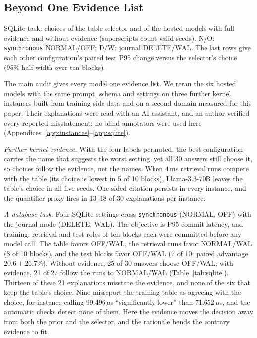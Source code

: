 \subsection{Beyond One Evidence List}
\label{subsec:generality}
\begin{table}[t]
\centering\footnotesize\setlength{\tabcolsep}{3pt}
\caption{SQLite task: choices of the table selector and of the hosted models with full evidence and without evidence (superscripts count valid seeds). N/O: \texttt{synchronous} NORMAL/OFF; D/W: journal DELETE/WAL. The last rows give each other configuration's paired test P95 change versus the selector's choice (95\% half-width over ten blocks).}
\label{tab:sqlite}
\begin{adjustbox}{max width=\columnwidth}

\end{adjustbox}
\end{table}

The main audit gives every model one evidence list. We reran the six hosted models with the same prompt, schema and settings on three further kernel instances built from training-side data and on a second domain measured for this paper. Their explanations were read with an AI assistant, and an author verified every reported misstatement; no blind annotators were used here (Appendices~\ref{app:instances}--\ref{app:sqlite}).

\emph{Further kernel evidence.} With the four labels permuted, the best configuration carries the name that suggests the worst setting, yet all 30 answers still choose it, so choices follow the evidence, not the names. When 4\,ms retrieval runs compete with the table (its choice is lowest in 5 of 10 blocks), Llama-3.3-70B leaves the table's choice in all five seeds. One-sided citation persists in every instance, and the quantifier proxy fires in 13--18 of 30 explanations per instance.

\emph{A database task.} Four SQLite settings cross \texttt{synchronous} (NORMAL, OFF) with the journal mode (DELETE, WAL). The objective is P95 commit latency, and training, retrieval and test roles of ten blocks each were committed before any model call. The table favors OFF/WAL, the retrieval runs favor NORMAL/WAL (8 of 10 blocks), and the test blocks favor OFF/WAL (7 of 10; paired advantage $20.6\pm26.7\%$). Without evidence, 25 of 30 answers choose OFF/WAL; with evidence, 21 of 27 follow the runs to NORMAL/WAL (Table~\ref{tab:sqlite}). Thirteen of these 21 explanations misstate the evidence, and none of the six that keep the table's choice. Nine misreport the training table as agreeing with the choice, for instance calling 99.496\,$\mu$s ``significantly lower'' than 71.652\,$\mu$s, and the automatic checks detect none of them. Here the evidence moves the decision away from both the prior and the selector, and the rationale bends the contrary evidence to fit.
